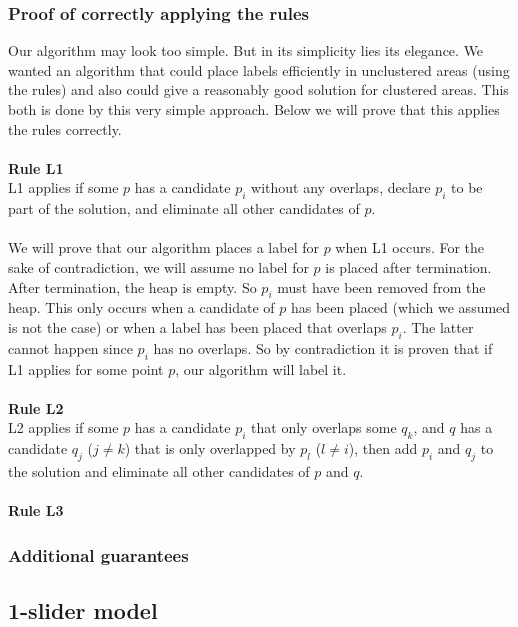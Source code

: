 \documentclass[crop=false,a4paper,oneside,11pt]{article}
\begin{document}
\subsubsection{Proof of correctly applying the rules}
Our algorithm may look too simple. But in its simplicity lies its elegance. We wanted an algorithm that could place labels efficiently in unclustered areas (using the rules) and also could give a reasonably good solution for clustered areas. This both is done by this very simple approach. Below we will prove that this applies the rules correctly.\\
\\
\textbf{Rule L1}\\
L1 applies if some $p$ has a candidate $p_i$ without any overlaps, declare $p_i$ to be part of the
solution, and eliminate all other candidates of $p$.\\
\\
We will prove that our algorithm places a label for $p$ when L1 occurs. For the sake of contradiction, we will assume no label for $p$ is placed after termination. After termination, the heap is empty. So $p_i$ must have been removed from the heap. This only occurs when a candidate of $p$ has been placed (which we assumed is not the case) or when a label has been placed that overlaps $p_i$. The latter cannot happen since $p_i$ has no overlaps. So by contradiction it is proven that if L1 applies for some point $p$, our algorithm will label it.\\
\\
\textbf{Rule L2}\\
L2 applies if some $p$ has a candidate $p_i$ that only overlaps some $q_k$, and $q$ has a
candidate $q_j$ ($j \neq k$) that is only overlapped by $p_l$ ($l \neq i$), then add $p_i$
and $q_j$ to the solution and eliminate all other candidates of $p$ and $q$.\\
\\

\textbf{Rule L3}\\

\subsubsection{Additional guarantees}


\subsection{1-slider model}
\end{document}

